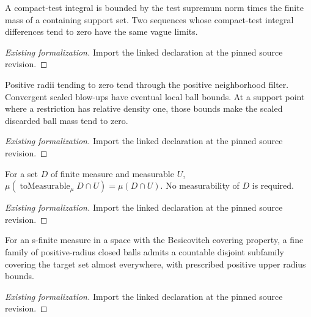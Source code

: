 \begin{lemma}
\label{gmt:compact-test-perturbation}
\leanok
A compact-test integral is bounded by the test supremum norm times the finite mass of a containing support set. Two sequences whose compact-test integral differences tend to zero have the same vague limits.
\end{lemma}
\begin{proof}[Existing formalization]
\leanok
{}
Import the linked declaration at the pinned source revision.
\end{proof}

\begin{lemma}
\label{gmt:scaled-discarded-mass}
\leanok
Positive radii tending to zero tend through the positive neighborhood filter. Convergent scaled blow-ups have eventual local ball bounds. At a support point where a restriction has relative density one, those bounds make the scaled discarded ball mass tend to zero.
\end{lemma}
\begin{proof}[Existing formalization]
\leanok
{}
Import the linked declaration at the pinned source revision.
\end{proof}

\begin{lemma}
\label{mathlib:measurable-hull}
\leanok
For a set $D$ of finite measure and measurable $U$, $\mu(\operatorname{toMeasurable}_\mu D\cap U)=\mu(D\cap U)$. No measurability of $D$ is required.
\end{lemma}
\begin{proof}[Existing formalization]
\leanok
Import the linked declaration at the pinned source revision.
\end{proof}

\begin{lemma}
\label{mathlib:besicovitch-cover}
\leanok
For an s-finite measure in a space with the Besicovitch covering property, a fine family of positive-radius closed balls admits a countable disjoint subfamily covering the target set almost everywhere, with prescribed positive upper radius bounds.
\end{lemma}
\begin{proof}[Existing formalization]
\leanok
Import the linked declaration at the pinned source revision.
\end{proof}

